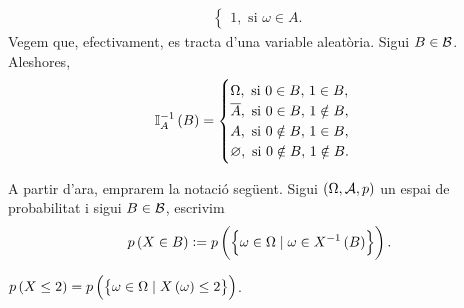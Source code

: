 \begin{example}
\begin{enumerate}[1.]
\begin{align*}
\begin{cases}
                    1, \text{ si } \omega\in A.
                \end{cases}
            \end{align*}
            Vegem que, efectivament, es tracta d'una variable aleatòria. Sigui $B\in\mathcal{B}$. Aleshores,
            \[
		    \mathbb{I}_A^{-1}\left( B\right)=\begin{cases}
                    \Omega, \text{ si } 0\in B,\, 1\in B,\\
                    \overline{A}, \text{ si } 0\in B,\, 1\notin B,\\
                    A, \text{ si } 0\notin B,\, 1\in B,\\
                    \varnothing, \text{ si } 0\notin B,\, 1\notin B.
                \end{cases}
            \]
    \end{enumerate}
\end{example}

\begin{obs}
    A partir d'ara, emprarem la notació següent. Sigui $(\Omega,\mathcal{A}, p)$ un espai de probabilitat i sigui $B\in\mathcal{B}$, escrivim
    \[
        p\left( X\in B\right):= p\left(\left\{\omega\in\Omega\mid\omega\in X^{-1}\left( B\right)\right\}\right).
    \]
\end{obs}

\begin{example}
    $p\left( X\leq 2\right) = p\left(\left\{\omega\in\Omega\mid X\left(\omega\right)\leq 2\right\}\right)$.
\end{example}

